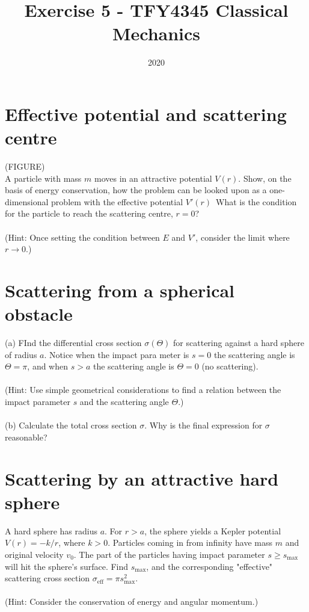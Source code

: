 \documentclass{article}
\title{Exercise 5 - TFY4345 Classical Mechanics}
\date{2020}
\begin{document}
    \maketitle
    \section{Effective potential and scattering centre}
        (FIGURE) \\
        A particle with mass $m$ moves in an attractive potential $V(r)$. Show, on the basis of energy conservation, how the problem can be looked upon as a one-dimensional problem with the effective potential $V'(r)$ What is the condition for the particle to reach the scattering centre, $r=0$? \\ \\
    (Hint: Once setting the condition between $E$ and $V'$, consider the limit where $r \rightarrow 0$.)

    \section{Scattering from a spherical obstacle}
        (a) FInd the differential cross section $\sigma(\Theta)$ for scattering against a hard sphere of radius $a$. Notice when the impact para meter is $s = 0$ the scattering angle is $\Theta = \pi$, and when $s > a$ the scattering angle is $\Theta = 0$ (no scattering). \\ \\
        (Hint: Use simple geometrical considerations to find a relation between the impact parameter $s$ and the scattering angle $\Theta$.) \\ \\
        (b) Calculate the total cross section $\sigma$. Why is the final expression for $\sigma$ reasonable?

    \section{Scattering by an attractive hard sphere}
        A hard sphere has radius $a$. For $r > a$, the sphere yields a Kepler potential $V(r) = - k/r$, where $k>0$. Particles coming in from infinity have mass $m$ and original velocity $v_0$. The part of the particles having impact parameter $s \geq s_{\mathrm{max}}$ will hit the sphere's surface. Find $s_{\mathrm{max}}$, and the corresponding "effective" scattering cross section $\sigma_\mathrm{eff} = \pi s_{\mathrm{max}}^2$. \\ \\
        (Hint: Consider the conservation of energy and angular momentum.)
\end{document}
